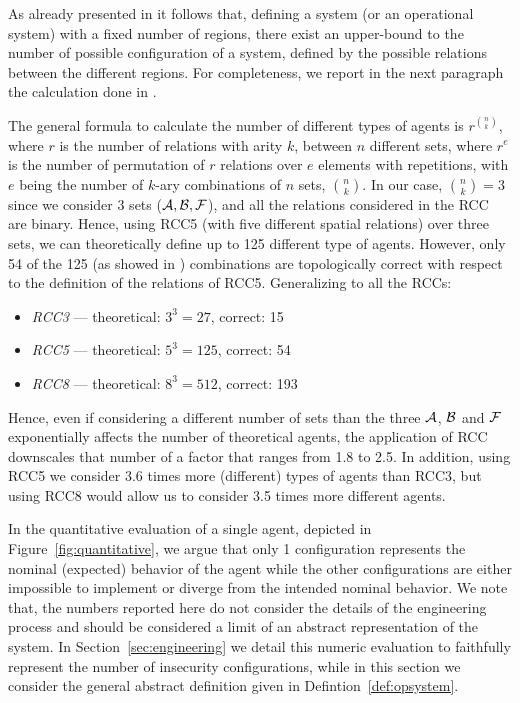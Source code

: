 As already presented in \autocite{Santaca2016abf} it follows that, defining
a system (or an operational system) with a fixed number of regions, there exist
an upper-bound to the number of possible configuration of a system, defined by
the possible relations between the different regions.
For completeness, we report in the next paragraph 
the calculation done in \autocite{Santaca2016abf}.

The general formula to calculate the number of different types of agents is
$r^{\binom{n}{k}}$, where $r$ is the number of relations with arity $k$,
between $n$ different sets, where $r^e$ is the number of permutation of $r$
relations over $e$ elements with repetitions, with $e$ being the number of
$k$-ary combinations of $n$ sets, $\binom{n}{k}$.
In our case, $\binom{n}{k}=3$ since we consider $3$ sets
($\mathcal{A},\mathcal{B},\mathcal{F}$), and all the relations
considered in the RCC are binary.  Hence, using RCC5 (with five different
spatial relations) over three sets, we can theoretically define up to 125
different type of agents. However, only 54 of the 125 (as showed in
\cite{improvingRCC}) combinations are topologically correct with respect to
the definition of the relations of RCC5. Generalizing to all the RCCs:

\begin{itemize}%
\item \emph{RCC3} --- theoretical: $3^3=27$,  correct: 15 
\item \emph{RCC5} --- theoretical: $5^3=125$, correct: 54
\item \emph{RCC8} --- theoretical: $8^3=512$, correct: 193
\end{itemize}

Hence, even if considering a different number of sets than the three
$\mathcal{A}$, $\mathcal{B}$ and $\mathcal{F}$ exponentially affects
the number of theoretical agents, the application of RCC downscales that number
of a factor that ranges from 1.8 to 2.5. In addition, using RCC5 we consider
3.6 times more (different) types of agents than RCC3, but using RCC8 would
allow us to consider 3.5 times more different agents.

In the quantitative evaluation of a single agent, depicted in Figure~\ref{fig:quantitative},
we argue that only 1 configuration represents the nominal (expected) behavior 
of the agent while the other configurations are either impossible to 
implement or diverge from the intended nominal behavior. We note 
that, the numbers reported here do not consider the details of the
engineering process and should be considered a limit of an abstract 
representation of the system. In Section~\ref{sec:engineering} we
detail this numeric evaluation to faithfully represent the
number of insecurity configurations, while in this section we consider
the general abstract definition given in Defintion~\ref{def:opsystem}.

